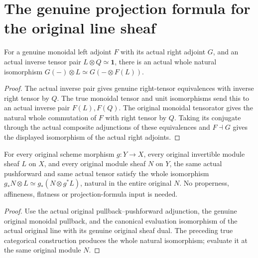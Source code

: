 \section{The genuine projection formula for the original line sheaf}

\begin{definition}
\label{def:fc-projection-formula-tensor-inverse}
\leanok
{}
For a genuine monoidal left adjoint $F$ with its actual right adjoint $G$,
and an actual inverse tensor pair $L\otimes Q\simeq\mathbf1$, there is an
actual whole natural isomorphism
$G(-)\otimes L\simeq G(-\otimes F(L))$.
\end{definition}
\begin{proof}
The actual inverse pair gives genuine right-tensor equivalences with inverse
right tensor by $Q$. The true monoidal tensor and unit isomorphisms send this
to an actual inverse pair $F(L),F(Q)$. The original monoidal tensorator gives
the natural whole commutation of $F$ with right tensor by $Q$. Taking its
conjugate through the actual composite adjunctions of these equivalences and
$F\dashv G$ gives the displayed isomorphism of the actual right adjoints.
\end{proof}

\begin{theorem}
\label{thm:fc-original-scheme-line-projection-formula}
\leanok
{}
For every original scheme morphism $g:Y\to X$, every original invertible
module sheaf $L$ on $X$, and every original module sheaf $N$ on $Y$, the same
actual pushforward and same actual tensor satisfy the whole isomorphism
$g_*N\otimes L\simeq g_*(N\otimes g^*L)$, natural in the entire original $N$.
No properness, affineness, flatness or projection-formula input is needed.
\end{theorem}
\begin{proof}
Use the actual original pullback--pushforward adjunction, the genuine original
monoidal pullback, and the canonical evaluation isomorphism of the actual
original line with its genuine original sheaf dual. The preceding true
categorical construction produces the whole natural isomorphism; evaluate
it at the same original module $N$.
\end{proof}
